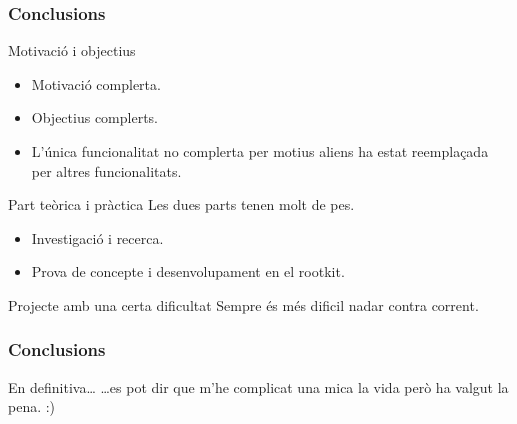 \documentclass{beamer}
\begin{document}
\begin{frame}
	\frametitle{Conclusions}

	\begin{block}{Motivació i objectius}
		\begin{itemize}
			\item Motivació complerta.
			\item Objectius complerts.
			\item L'única funcionalitat no complerta per motius aliens ha estat reemplaçada per altres funcionalitats.
		\end{itemize}
	\end{block}

	\begin{block}{Part teòrica i pràctica}
		Les dues parts tenen molt de pes.
		\begin{itemize}
			\item Investigació i recerca.
			\item Prova de concepte i desenvolupament en el rootkit.
		\end{itemize}
	\end{block}

	\begin{block}{Projecte amb una certa dificultat}
	Sempre és més dificil nadar contra corrent.
	\end{block}

\end{frame}

\begin{frame}
    \frametitle{Conclusions}
	\begin{block}{En definitiva\ldots}
	 \ldots es pot dir que m'he complicat una mica la vida però ha valgut la pena. :)
	\end{block}
\end{frame}
\end{document}
